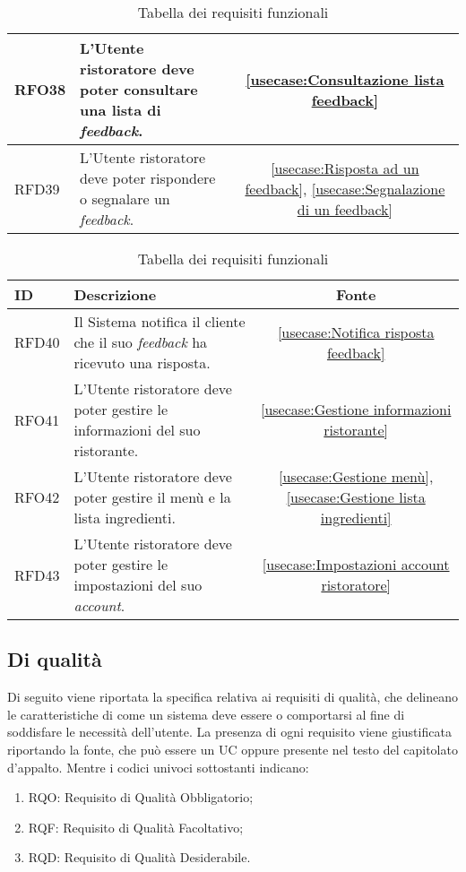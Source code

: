 \begin{table}[H]
\begin{tabularx}{\textwidth}{l|X|c}
		\hline
		RFO38       & L'Utente ristoratore deve poter consultare una lista di \textit{feedback}.										            &  \autoref{usecase:Consultazione lista feedback}           \\
		\hline
		RFD39       & L'Utente ristoratore deve poter rispondere o segnalare un \textit{feedback}.                          				 		&  \autoref{usecase:Risposta ad un feedback}, \autoref{usecase:Segnalazione di un feedback}          \\
		\hline
\end{tabularx}
\caption{Tabella dei requisiti funzionali}
\end{table}


\begin{table}[H]
	\renewcommand{\arraystretch}{1.5}
	\centering
	\begin{tabularx}{\textwidth}{l|X|c}
		\textbf{ID} & \textbf{Descrizione}                                                                                                      & \textbf{Fonte} \\
		\hline
		RFD40       & Il Sistema notifica il cliente che il suo \textit{feedback} ha ricevuto una risposta.                          				&  \autoref{usecase:Notifica risposta feedback}           \\
		\hline
		RFO41       & L'Utente ristoratore deve poter gestire le informazioni del suo ristorante.												    &  \autoref{usecase:Gestione informazioni ristorante}           \\
		\hline
		RFO42       & L'Utente ristoratore deve poter gestire il menù e la lista ingredienti.												        &  \autoref{usecase:Gestione menù}, \autoref{usecase:Gestione lista ingredienti}           \\
		\hline
		RFD43       & L'Utente ristoratore deve poter gestire le impostazioni del suo \textit{account}.												&  \autoref{usecase:Impostazioni account ristoratore}           \\
		\hline
\end{tabularx}
\caption{Tabella dei requisiti funzionali}
\end{table}


\subsection{Di qualità}

Di seguito viene riportata la specifica relativa ai requisiti di qualità, che delineano le caratteristiche di come un sistema 
deve essere o comportarsi al fine di soddisfare le necessità dell'utente.
La presenza di ogni requisito viene giustificata riportando la fonte, che può essere un UC oppure presente 
nel testo del capitolato d'appalto. Mentre i codici univoci sottostanti indicano:
\begin{enumerate}
	\item RQO: Requisito di Qualità Obbligatorio;
	\item RQF: Requisito di Qualità Facoltativo;
	\item RQD: Requisito di Qualità Desiderabile.
\end{enumerate}

